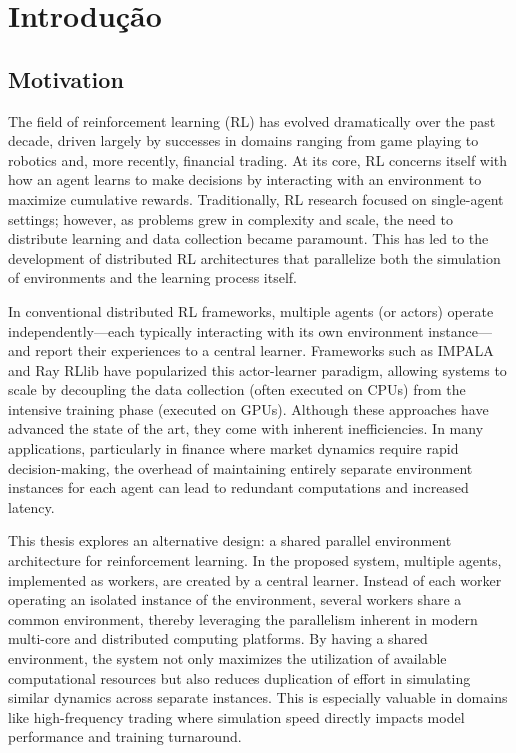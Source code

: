 
\chapter[Introduction]{Introdução}
\label{ch:introduction}

\section{Motivation}
\label{sec:motivation}

The field of reinforcement learning (RL) has evolved dramatically over the past decade,
driven largely by successes in domains ranging from game playing to robotics and, more recently, financial trading.
At its core, RL concerns itself with how an agent learns to make decisions by interacting with an environment to maximize cumulative rewards.
Traditionally, RL research focused on single-agent settings;
however, as problems grew in complexity and scale, the need to distribute learning and data collection became paramount.
This has led to the development of distributed RL architectures that parallelize both the simulation of environments and the learning process itself.

In conventional distributed RL frameworks, multiple agents (or actors) operate independently—each typically interacting with
its own environment instance—and report their experiences to a central learner.
Frameworks such as IMPALA and Ray RLlib have popularized this actor-learner paradigm,
allowing systems to scale by decoupling the data collection (often executed on CPUs) from the intensive training phase (executed on GPUs).
Although these approaches have advanced the state of the art, they come with inherent inefficiencies.
In many applications, particularly in finance where market dynamics require rapid decision-making,
the overhead of maintaining entirely separate environment instances for each agent can lead to redundant computations and increased latency.


This thesis explores an alternative design: a shared parallel environment architecture for reinforcement learning.
In the proposed system, multiple agents, implemented as workers, are created by a central learner.
Instead of each worker operating an isolated instance of the environment, several workers share a common environment,
thereby leveraging the parallelism inherent in modern multi-core and distributed computing platforms.
By having a shared environment, the system not only maximizes the utilization of available
computational resources but also reduces duplication of effort in simulating similar dynamics across separate instances.
This is especially valuable in domains like high-frequency trading where simulation speed directly impacts model performance and training turnaround.



